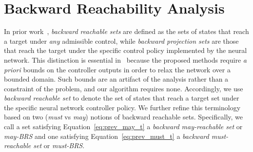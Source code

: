 \documentclass[letterpaper, 10 pt, conference]{ieeeconf}  %
\newcommand{\sa}[1]{\noindent\textcolor{red}{\newline SA: #1}}
\newcommand{\cb}[1]{\noindent\textcolor{magenta}{\newline CB: #1}}
\newcommand{\sa}[1]{}
\newcommand{\cb}[1]{}
\begin{document}

\section{Backward Reachability Analysis}
\label{sec:reach analysis}
In prior work~\cite{rober2023backward}, \emph{backward reachable sets} are defined as the sets of states that reach a target under \emph{any} admissible control, while \emph{backward projection sets} are those that reach the target under the specific control policy implemented by the neural network. This distinction is essential in~\cite{rober2023backward} because the proposed methods require \emph{a priori} bounds on the controller outputs in order to relax the network over a bounded domain. Such bounds are an artifact of the analysis rather than a constraint of the problem, and our algorithm requires none. Accordingly, we use \emph{backward reachable set} to denote the set of states that reach a target set under the specific neural network controller policy.  We further refine this terminology based on two (\emph{must} vs \emph{may}) notions of backward reachable sets.  Specifically, we call a set satisfying Equation~\eqref{eq:prev_may_t} a \emph{backward may-reachable set} or \emph{may-BRS} and one satisfying Equation~\eqref{eq:prev_must_t} a \emph{backward must-reachable set} or \emph{must-BRS}.
\end{document}
